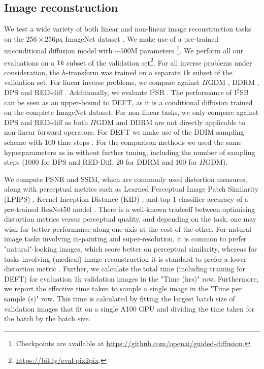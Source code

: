 \subsection{Image reconstruction}
\label{sec:image_rec}
We test a wide variety of both linear and non-linear image reconstruction tasks on the $256\times 256$px ImageNet dataset \cite{russakovsky2015imagenet}. We make use of a pre-trained unconditional diffusion model with $\sim500$M parameters \citep{dhariwal2021diffusion}\footnote{Checkpoints are available at \url{https://github.com/openai/guided-diffusion}.}. We perform all our evaluations on a $1k$ subset of the validation set\footnote{\url{https://bit.ly/eval-pix2pix}.}. For all inverse problems under consideration, the $h$-transform was trained on a separate $1$k subset of the validation set. For linear inverse problems, we compare against $\Pi$GDM \cite{song2022pseudoinverse}, DDRM \cite{kawar2022denoising}, DPS \cite{chung2022diffusion} and RED-diff \cite{mardani2023variational}. Additionally, we evaluate I$^2$SB \cite{liu20232}. The performance of I$^2$SB can be seen as an upper-bound to DEFT, as it is a conditional diffusion trained on the complete ImageNet dataset. For non-linear tasks, we only compare against DPS and RED-diff as both $\Pi$GDM and DDRM are not directly applicable to non-linear forward operators. For DEFT we make use of the DDIM sampling scheme with $100$ time steps \cite{song2021denoising}. For the comparison methods we used the same hyperparameters as in \textcite{mardani2023variational} without further tuning, including the number of sampling steps (1000 for DPS and RED-Diff, 20 for DDRM and 100 for $\Pi$GDM).

We compute PSNR and SSIM, which are commonly used distortion measures, along with perceptual metrics such as Learned Perceptual Image Patch Similarity (LPIPS) \cite{zhang2018unreasonable}, Kernel Inception Distance (KID) \cite{binkowski2018demystifying}, and top-1 classifier accuracy of a pre-trained ResNet50 model \cite{he2016deep}. There is a well-known tradeoff between optimising distortion metrics versus perceptual quality, and depending on the task, one may wish for better performance along one axis at the cost of the other. For natural image tasks involving in-painting and super-resolution, it is common to prefer "natural"-looking images, which score better on perceptual similarity, whereas for tasks involving (medical) image reconstruction
it is standard to prefer a lower distortion metric \cite{blau2018perception}. Further, we calculate the total time (including training for DEFT) for evaluation $1$k validation images in the "Time (hrs)" row. Furthermore, we report the effective time taken to sample a single image in the "Time per sample (s)" row. This time is calculated by fitting the largest batch size of validation images that fit on a single A100 GPU and dividing the time taken for the batch by the batch size. 

